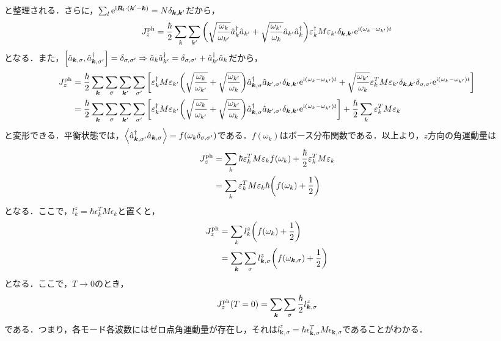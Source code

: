 \documentclass{report}
\begin{document}
と整理される．さらに，$\sum_l \mathrm{e}^{\mathrm{i}\bm{R}_l\cdot(\bm{k}' - \bm{k})} = N\delta_{\bm{k},\bm{k}'}$だから，
\begin{align}
  J_z^{\mathrm{ph}} = \frac{\hbar}{2} \sum_{k}\sum_{k'} \qty(\sqrt{\frac{\omega_k}{\omega_{k'}}} \hat{a}_k^\dagger\hat{a}_{k'} + \sqrt{\frac{\omega_{k'}}{\omega_k}}\hat{a}_{k'}\hat{a}_k^\dagger) \varepsilon_k^\dagger M \varepsilon_{k'} \delta_{\bm{k},\bm{k}'}\mathrm{e}^{\mathrm{i}(\omega_k - \omega_{k'})t}
\end{align}
となる．また，$\qty[\hat{a}_{\bm{k},\sigma},\hat{a}_{\bm{k},\sigma'}^{\dagger}] = \delta_{\sigma,\sigma'}\Rightarrow\hat{a}_k\hat{a}_{k'}^{\dagger}= \delta_{\sigma,\sigma'} + \hat{a}_{k'}^{\dagger}\hat{a}_k$だから，
\begin{align}
  J_z^{\mathrm{ph}} &= \frac{\hbar}{2} \sum_{\bm{k}}\sum_{\sigma}\sum_{\bm{k}'}\sum_{\sigma'} \qty[ \varepsilon_k^\dagger M \varepsilon_{k'} \qty(\sqrt{\frac{\omega_k}{\omega_{k'}}} + \sqrt{\frac{\omega_{k'}}{\omega_k}}) \hat{a}_{\bm{k},\sigma}^\dagger\hat{a}_{\bm{k}',\sigma'}\delta_{\bm{k},\bm{k}'} \mathrm{e}^{\mathrm{i}(\omega_k - \omega_{k'})t} + \sqrt{\frac{\omega_{k'}}{\omega_k}} \varepsilon_k^T M \varepsilon_{k'} \delta_{\bm{k},\bm{k}'}\delta_{\sigma,\sigma'} \mathrm{e}^{\mathrm{i}(\omega_k - \omega_{k'})t} ]\\
  &= \frac{\hbar}{2} \sum_{\bm{k}}\sum_{\sigma}\sum_{\bm{k}'}\sum_{\sigma'} \qty[ \varepsilon_k^\dagger M \varepsilon_{k'} \qty(\sqrt{\frac{\omega_k}{\omega_{k'}}} + \sqrt{\frac{\omega_{k'}}{\omega_k}}) \hat{a}_{\bm{k},\sigma}^\dagger\hat{a}_{\bm{k}',\sigma'}\delta_{\bm{k},\bm{k}'} \mathrm{e}^{\mathrm{i}(\omega_k - \omega_{k'})t} ] +\frac{\hbar}{2}\sum_{k} \varepsilon_k^T M \varepsilon_{k}\\
\end{align}
と変形できる．平衡状態では，$\ev{\hat{a}^\dagger_{\bm{k},\sigma'}\hat{a}_{\bm{k},\sigma}} = f(\omega_k\delta_{\sigma,\sigma'})$である．$f(\omega_k)$はボース分布関数である．以上より，$z$方向の角運動量は
\begin{align}
  J_z^{\mathrm{ph}} &= \sum_{k} \hbar \varepsilon_k^T M \varepsilon_k f(\omega_k) + \frac{\hbar}{2} \varepsilon_k^T M \varepsilon_k\\
  &= \sum_{k} \varepsilon_k^T M \varepsilon_k \hbar \qty(f(\omega_k) + \frac{1}{2})
\end{align}
となる．ここで，$l_{k}^z = \hbar \epsilon_k^T M \epsilon_k$と置くと，
\begin{align}
  J_z^{\mathrm{ph}} &= \sum_{k} l_{k}^z\qty(f(\omega_k) + \frac{1}{2})\\
  &= \sum_{\bm{k}}\sum_{\sigma} l_{\bm{k},\sigma}^z \qty(f(\omega_{\bm{k},\sigma}) + \frac{1}{2})
\end{align}
となる．ここで，$T\to0$のとき，
\begin{align}
  J_z^{\mathrm{ph}}(T=0) = \sum_{\bm{k}}\sum_{\sigma} \frac{\hbar}{2} l_{\bm{k},\sigma}^{z}
\end{align}
である．つまり，各モード各波数にはゼロ点角運動量が存在し，それは$l_{\bm{k},\sigma}^z = \hbar \epsilon_{\bm{k},\sigma}^T M \epsilon_{\bm{k},\sigma}$であることがわかる．
\end{document}
